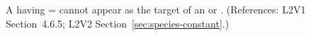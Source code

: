 A \Species having = cannot appear as the
target of an \AssignmentRule or \RateRule.  (References: L2V1
Section~4.6.5; L2V2 Section~\ref{sec:species-constant}.)
